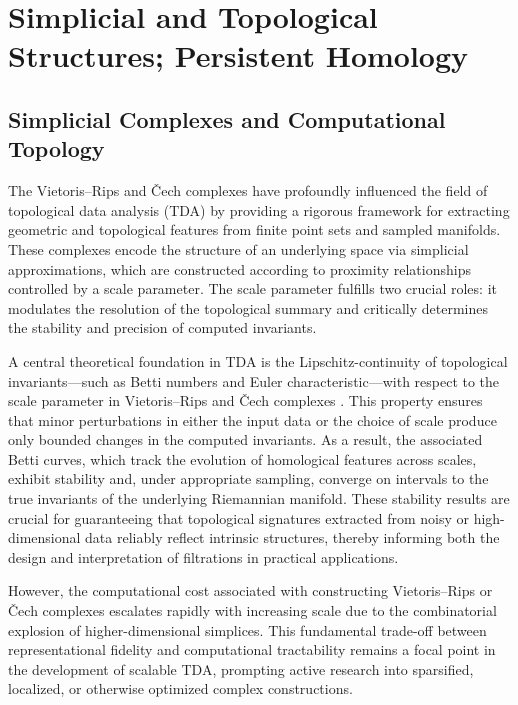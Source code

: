 \section{Simplicial and Topological Structures; Persistent Homology}

\subsection{Simplicial Complexes and Computational Topology}

The Vietoris–Rips and Čech complexes have profoundly influenced the field of topological data analysis (TDA) by providing a rigorous framework for extracting geometric and topological features from finite point sets and sampled manifolds. These complexes encode the structure of an underlying space via simplicial approximations, which are constructed according to proximity relationships controlled by a scale parameter. The scale parameter fulfills two crucial roles: it modulates the resolution of the topological summary and critically determines the stability and precision of computed invariants.

A central theoretical foundation in TDA is the Lipschitz-continuity of topological invariants—such as Betti numbers and Euler characteristic—with respect to the scale parameter in Vietoris–Rips and Čech complexes \cite{ref88}. This property ensures that minor perturbations in either the input data or the choice of scale produce only bounded changes in the computed invariants. As a result, the associated Betti curves, which track the evolution of homological features across scales, exhibit stability and, under appropriate sampling, converge on intervals to the true invariants of the underlying Riemannian manifold. These stability results are crucial for guaranteeing that topological signatures extracted from noisy or high-dimensional data reliably reflect intrinsic structures, thereby informing both the design and interpretation of filtrations in practical applications.

However, the computational cost associated with constructing Vietoris–Rips or Čech complexes escalates rapidly with increasing scale due to the combinatorial explosion of higher-dimensional simplices. This fundamental trade-off between representational fidelity and computational tractability remains a focal point in the development of scalable TDA, prompting active research into sparsified, localized, or otherwise optimized complex constructions.

